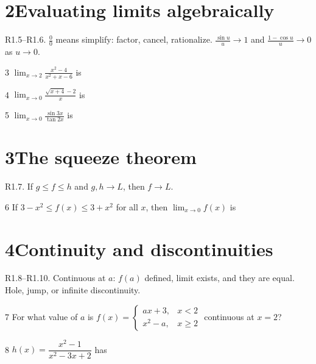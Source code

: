 \documentclass{apcalc}
\begin{document}
\section*{2\quad Evaluating limits algebraically}
\begin{setrule}R1.5–R1.6. $\tfrac00$ means simplify: factor, cancel, rationalize. $\frac{\sin u}{u}\to1$ and $\frac{1-\cos u}{u}\to0$ as $u\to0$.\end{setrule}
\begin{q}{3}
$\displaystyle\lim_{x\to2}\frac{x^2-4}{x^2+x-6}$ is
\end{q}
\begin{q}{4}
$\displaystyle\lim_{x\to0}\frac{\sqrt{x+4}-2}{x}$ is
\end{q}
\begin{q}{5}
$\displaystyle\lim_{x\to0}\frac{\sin 3x}{\tan 2x}$ is
\end{q}
\section*{3\quad The squeeze theorem}
\begin{setrule}R1.7. If $g\le f\le h$ and $g,h\to L$, then $f\to L$.\end{setrule}
\begin{q}{6}
If $3-x^2\le f(x)\le 3+x^2$ for all $x$, then $\displaystyle\lim_{x\to0}f(x)$ is
\end{q}
\section*{4\quad Continuity and discontinuities}
\begin{setrule}R1.8–R1.10. Continuous at $a$: $f(a)$ defined, limit exists, and they are equal. Hole, jump, or infinite discontinuity.\end{setrule}
\begin{q}{7}
For what value of $a$ is $f(x)=\begin{cases}ax+3,&x<2\\ x^2-a,&x\ge2\end{cases}$ continuous at $x=2$?
\end{q}
\begin{q}{8}
$h(x)=\dfrac{x^2-1}{x^2-3x+2}$ has
\end{q}
\end{document}
